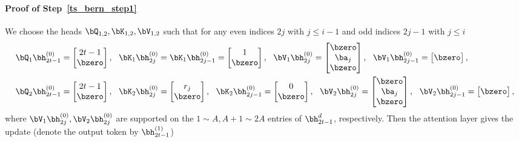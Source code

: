 \paragraph{Proof of Step~\ref{ts_bern_step1}} We choose the heads $\bQ_{1,2},\bK_{1,2},\bV_{1,2}$ such that for any even indices $2j$ with $j\leq i-1$ and odd indices $2j-1$ with $j\leq i$
\begin{align*}
&
     \bQ_{1}\bh^{(0)}_{2t-1}=\begin{bmatrix}
         2t-1\\ \bzero
    \end{bmatrix},~~ \bK_{1}\bh^{(0)}_{2j}=\bK_{1}\bh^{(0)}_{2j-1}=\begin{bmatrix}
        1\\ \bzero
    \end{bmatrix},~~ 
   \bV_{1}\bh^{(0)}_{2j}=\begin{bmatrix}
        \bzero\\\ba_j\\ \bzero
\end{bmatrix},~~\bV_{1}\bh^{(0)}_{2j-1}=\begin{bmatrix}
        \bzero
    \end{bmatrix},\\
   &
     \bQ_{2}\bh^{(0)}_{2t-1}=\begin{bmatrix}
         2t-1\\ \bzero
    \end{bmatrix},~~ \bK_{2}\bh^{(0)}_{2j}=\begin{bmatrix}
        r_j\\ \bzero
    \end{bmatrix},~~\bK_{2}\bh^{(0)}_{2j-1}=\begin{bmatrix}
        0\\ \bzero
    \end{bmatrix},~~ 
   \bV_{2}\bh^{(0)}_{2j}=\begin{bmatrix}
        \bzero\\\ba_j\\ \bzero
\end{bmatrix},~~\bV_{2}\bh^{(0)}_{2j-1}=\begin{bmatrix}
        \bzero
    \end{bmatrix},
\end{align*}
where $\bV_{1}\bh^{(0)}_{2j},\bV_{2}\bh^{(0)}_{2j}$ are supported on the $1\sim A,A+1\sim 2A$ entries of $\bh^d_{2t-1}$, respectively. Then the attention layer gives the update (denote the output token by $\bh^{(1)}_{2t-1}$)
